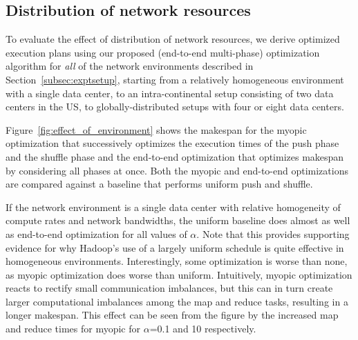 \subsection{Distribution of network resources}
\label{subsec:network}
To evaluate the effect of distribution of network resources, we derive
optimized execution plans using our proposed (end-to-end multi-phase)
optimization algorithm for {\em all} of the network environments described in
Section~\ref{subsec:exptsetup}, starting from a relatively homogeneous
environment with a single data center, to an intra-continental setup consisting
of two data centers in the US, to globally-distributed setups with four or
eight data centers.
\begin{figure*}[htbp]
  \centering
  \caption{A comparison of myopic and end-to-end optimization relative to the
  uniform baseline for different network environments and different values of
  $\alpha$.
  The makespans are normalized by computing the ratio of the actual makespan to
  the makespan of the corresponding uniform schedule.
  A global barrier is used between phases in all cases.}
  \label{fig:effect_of_environment}
\end{figure*}

Figure~\ref{fig:effect_of_environment} shows the makespan for the myopic
optimization that successively optimizes the execution times of the push phase
and the shuffle phase and the end-to-end optimization that optimizes makespan
by considering all phases at once.
Both the myopic and end-to-end optimizations are compared against a baseline
that performs uniform push and shuffle.

If the network environment is a single data center with relative homogeneity of
compute rates and network bandwidths, the uniform baseline does almost as well
as end-to-end optimization for all values of $\alpha$.
Note that this provides supporting evidence for why Hadoop's use of a largely
uniform schedule is quite effective in homogeneous environments.
Interestingly, some optimization is worse than none, as myopic optimization
does worse than uniform.
Intuitively, myopic optimization reacts to rectify small communication
imbalances, but this can in turn create larger computational imbalances among
the map and reduce tasks, resulting in a longer makespan.
This effect can be seen from the figure by the increased map and reduce times
for myopic for $\alpha$=0.1 and 10 respectively.

